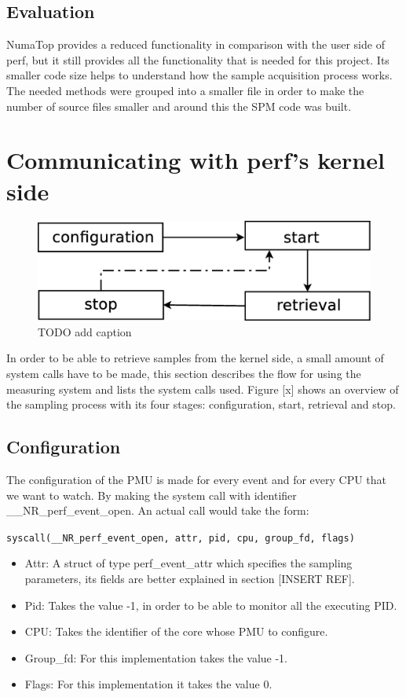 \subsection{Evaluation}\label{section:sol-evltn}
NumaTop provides a reduced functionality in comparison with the user side of perf, but it still provides all the functionality that is needed for this project. Its smaller code size helps to understand how the sample acquisition process works. The needed methods were grouped into a smaller file in order to make the number of source files smaller and around this the SPM code was built.

\section{Communicating with perf's kernel side}\label{section:ovv-perfks}

\begin{figure}
	\centering
		\includegraphics[width=.7\textwidth]{figures/sampling-process.eps}
		\caption[sampling-process]{TODO add caption}
		\label{fig:dstrategy}
\end{figure}

In order to be able to retrieve samples from the kernel side, a small amount of system calls have to be made, this section describes the flow for using the measuring system and lists the system calls used. Figure [x] shows an overview of the sampling process with its four stages: configuration, start, retrieval and stop.

\subsection{Configuration}\label{section:confgtn}
The configuration of the PMU is made for every event and for every CPU  that we want to watch. By making the system call with identifier \_\_NR\_perf\_event\_open. An actual call would take the form: 

\texttt{syscall(\_\_NR\_perf\_event\_open, attr, pid, cpu, group\_fd, flags) }

\begin{itemize}
	\item Attr: A struct of type perf\_event\_attr which specifies the sampling parameters, its fields are better explained in section [INSERT REF]. 
	\item Pid: Takes the value -1, in order to be able to monitor all the executing PID.
	\item CPU: Takes the identifier of the core whose PMU to configure.
	\item Group\_fd: For this implementation takes the value -1.
	\item Flags: For this implementation it takes the value 0.
\end{itemize}

